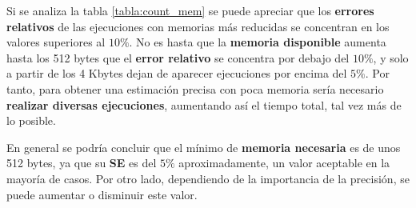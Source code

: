 Si se analiza la tabla \ref{tabla:count_mem} se puede apreciar que los
\textbf{errores relativos} de las ejecuciones con memorias más reducidas se concentran en los valores superiores al $10\%$. No es
hasta que la \textbf{memoria disponible} aumenta hasta los 512 bytes que el \textbf{error relativo} se concentra por debajo del
$10\%$, y solo a partir de los 4 Kbytes dejan de aparecer ejecuciones por encima del $5\%$. Por tanto, para obtener una estimación
precisa con poca memoria sería necesario \textbf{realizar diversas ejecuciones}, aumentando así el tiempo total, tal vez más de lo
posible.

En general se podría concluir que el mínimo de \textbf{memoria necesaria} es de unos 512 bytes, ya que su \textbf{SE} es del $5\%$
aproximadamente, un valor aceptable en la mayoría de casos. Por otro lado, dependiendo de la importancia de la precisión, se puede
aumentar o disminuir este valor.

